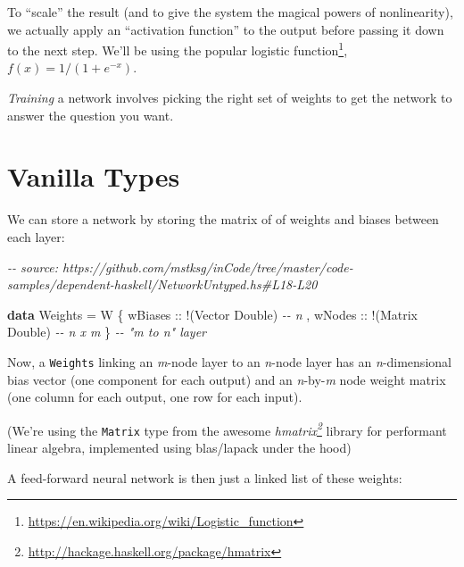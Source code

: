 \documentclass[]{article}
\newenvironment{Shaded}{}{}
\newcommand{\CommentTok}[1]{\textcolor[rgb]{0.38,0.63,0.69}{\textit{#1}}}
\newcommand{\DataTypeTok}[1]{\textcolor[rgb]{0.56,0.13,0.00}{#1}}
\newcommand{\KeywordTok}[1]{\textcolor[rgb]{0.00,0.44,0.13}{\textbf{#1}}}
\newcommand{\NormalTok}[1]{#1}
\newcommand{\OperatorTok}[1]{\textcolor[rgb]{0.40,0.40,0.40}{#1}}
\newcommand{\OtherTok}[1]{\textcolor[rgb]{0.00,0.44,0.13}{#1}}
\renewcommand{\href}[2]{#2\footnote{\url{#1}}}
\begin{document}
To ``scale'' the result (and to give the system the magical powers of
nonlinearity), we actually apply an ``activation function'' to the output before
passing it down to the next step. We'll be using the popular
\href{https://en.wikipedia.org/wiki/Logistic_function}{logistic function},
\(f(x) = 1 / (1 + e^{-x})\).

\emph{Training} a network involves picking the right set of weights to get the
network to answer the question you want.

\section{Vanilla Types}\label{vanilla-types}

We can store a network by storing the matrix of of weights and biases between
each layer:

\begin{Shaded}
\begin{Highlighting}[]
\CommentTok{{-}{-} source: https://github.com/mstksg/inCode/tree/master/code{-}samples/dependent{-}haskell/NetworkUntyped.hs\#L18{-}L20}

\KeywordTok{data} \DataTypeTok{Weights} \OtherTok{=} \DataTypeTok{W}\NormalTok{ \{}\OtherTok{ wBiases ::} \OperatorTok{!}\NormalTok{(}\DataTypeTok{Vector} \DataTypeTok{Double}\NormalTok{)  }\CommentTok{{-}{-} n}
\NormalTok{                 ,}\OtherTok{ wNodes  ::} \OperatorTok{!}\NormalTok{(}\DataTypeTok{Matrix} \DataTypeTok{Double}\NormalTok{)  }\CommentTok{{-}{-} n x m}
\NormalTok{                 \}                              }\CommentTok{{-}{-} "m to n" layer}
\end{Highlighting}
\end{Shaded}

Now, a \texttt{Weights} linking an \emph{m}-node layer to an \emph{n}-node layer
has an \emph{n}-dimensional bias vector (one component for each output) and an
\emph{n}-by-\emph{m} node weight matrix (one column for each output, one row for
each input).

(We're using the \texttt{Matrix} type from the awesome
\emph{\href{http://hackage.haskell.org/package/hmatrix}{hmatrix}} library for
performant linear algebra, implemented using blas/lapack under the hood)

A feed-forward neural network is then just a linked list of these weights:
\end{document}
